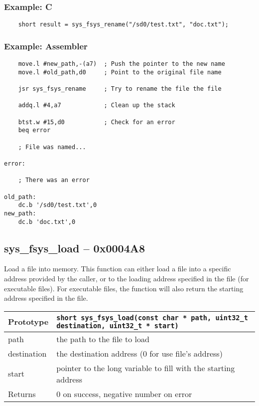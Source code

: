 \subsubsection*{Example: C}
\begin{lstlisting}
    short result = sys_fsys_rename("/sd0/test.txt", "doc.txt");
\end{lstlisting}

\subsubsection*{Example: Assembler}
\begin{verbatim}
    move.l #new_path,-(a7)	; Push the pointer to the new name
    move.l #old_path,d0     ; Point to the original file name

    jsr sys_fsys_rename 	; Try to rename the file the file

    addq.l #4,a7            ; Clean up the stack

    btst.w #15,d0           ; Check for an error
    beq error

    ; File was named...

error:

    ; There was an error

old_path:
    dc.b '/sd0/test.txt',0
new_path:
    dc.b 'doc.txt',0
\end{verbatim}

\subsection*{sys\_fsys\_load -- 0x0004A8}
Load a file into memory. This function can either load a file into a specific address provided by the caller,
or to the loading address specified in the file (for executable files). For executable files, the function will also
return the starting address specified in the file.

\bigskip

\begin{tabular}{|l||l|} \hline
Prototype & \lstinline!short sys_fsys_load(const char * path, uint32_t destination, uint32_t * start)! \\ \hline
path & the path to the file to load \\ \hline
destination & the destination address (0 for use file's address) \\ \hline
start & pointer to the long variable to fill with the starting address \\ \hline
Returns & 0 on success, negative number on error \\ \hline
\end{tabular}


